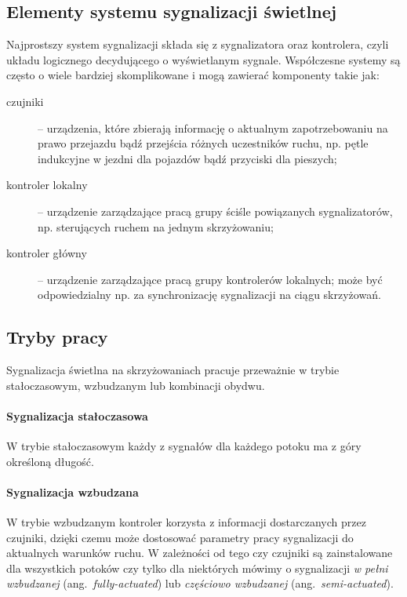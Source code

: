 \documentclass{pracamgr}
\newcommand{\ang}[1]{(ang.~\emph{#1})}
\begin{document}
\subsection{Elementy systemu sygnalizacji świetlnej}
\label{ss:elementy}
Najprostszy system sygnalizacji składa się z sygnalizatora oraz
kontrolera, czyli układu logicznego decydującego o wyświetlanym
sygnale. Współczesne systemy są często o wiele bardziej skomplikowane
i mogą zawierać komponenty takie jak:
\begin{description}
  \item[czujniki] -- urządzenia, które zbierają informację o aktualnym
  zapotrzebowaniu na prawo przejazdu bądź przejścia różnych
  uczestników ruchu, np. pętle indukcyjne w jezdni dla pojazdów bądź
  przyciski dla pieszych;
  \item[kontroler lokalny] -- urządzenie zarządzające pracą grupy
  ściśle powiązanych sygnalizatorów, np. sterujących ruchem na jednym
  skrzyżowaniu;
  \item[kontroler główny] -- urządzenie zarządzające pracą grupy
  kontrolerów lokalnych; może być odpowiedzialny np. za synchronizację
  sygnalizacji na ciągu skrzyżowań.
\end{description}

\subsection{Tryby pracy}
\label{ss:tryby}
Sygnalizacja świetlna na skrzyżowaniach pracuje przeważnie w trybie
stałoczasowym, wzbudzanym lub kombinacji obydwu.

\paragraph{Sygnalizacja stałoczasowa}
W trybie stałoczasowym każdy z sygnałów dla każdego potoku ma z góry
określoną długość.

\paragraph{Sygnalizacja wzbudzana}
W trybie wzbudzanym kontroler korzysta z informacji dostarczanych
przez czujniki, dzięki czemu może dostosować parametry pracy
sygnalizacji do aktualnych warunków ruchu. W zależności od tego czy
czujniki są zainstalowane dla wszystkich potoków czy tylko dla
niektórych mówimy o sygnalizacji \emph{w pełni wzbudzanej}
\ang{fully-actuated} lub \emph{częściowo wzbudzanej}
\ang{semi-actuated}.
\end{document}

